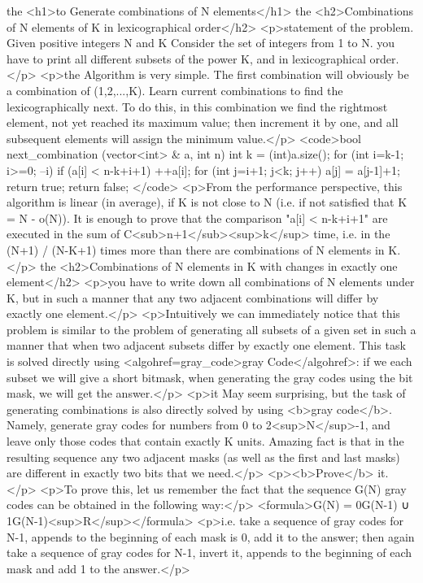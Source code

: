 the <h1>to Generate combinations of N elements</h1>
the <h2>Combinations of N elements of K in lexicographical order</h2>
<p>statement of the problem. Given positive integers N and K Consider the set of integers from 1 to N. you have to print all different subsets of the power K, and in lexicographical order.</p>
<p>the Algorithm is very simple. The first combination will obviously be a combination of (1,2,...,K). Learn current combinations to find the lexicographically next. To do this, in this combination we find the rightmost element, not yet reached its maximum value; then increment it by one, and all subsequent elements will assign the minimum value.</p>
<code>bool next_combination (vector<int> & a, int n) {
int k = (int)a.size();
for (int i=k-1; i>=0; --i)
if (a[i] < n-k+i+1) {
++a[i];
for (int j=i+1; j<k; j++)
a[j] = a[j-1]+1;
return true;
}
return false;
}</code>
<p>From the performance perspective, this algorithm is linear (in average), if K is not close to N (i.e. if not satisfied that K = N - o(N)). It is enough to prove that the comparison "a[i] < n-k+i+1" are executed in the sum of C<sub>n+1</sub><sup>k</sup> time, i.e. in the (N+1) / (N-K+1) times more than there are combinations of N elements in K.</p>
the <h2>Combinations of N elements in K with changes in exactly one element</h2>
<p>you have to write down all combinations of N elements under K, but in such a manner that any two adjacent combinations will differ by exactly one element.</p>
<p>Intuitively we can immediately notice that this problem is similar to the problem of generating all subsets of a given set in such a manner that when two adjacent subsets differ by exactly one element. This task is solved directly using <algohref=gray_code>gray Code</algohref>: if we each subset we will give a short bitmask, when generating the gray codes using the bit mask, we will get the answer.</p>
<p>it May seem surprising, but the task of generating combinations is also directly solved by using <b>gray code</b>. Namely, generate gray codes for numbers from 0 to 2<sup>N</sup>-1, and leave only those codes that contain exactly K units. Amazing fact is that in the resulting sequence any two adjacent masks (as well as the first and last masks) are different in exactly two bits that we need.</p>
<p><b>Prove</b> it.</p>
<p>To prove this, let us remember the fact that the sequence G(N) gray codes can be obtained in the following way:</p>
<formula>G(N) = 0G(N-1) ∪ 1G(N-1)<sup>R</sup></formula>
<p>i.e. take a sequence of gray codes for N-1, appends to the beginning of each mask is 0, add it to the answer; then again take a sequence of gray codes for N-1, invert it, appends to the beginning of each mask and add 1 to the answer.</p>
